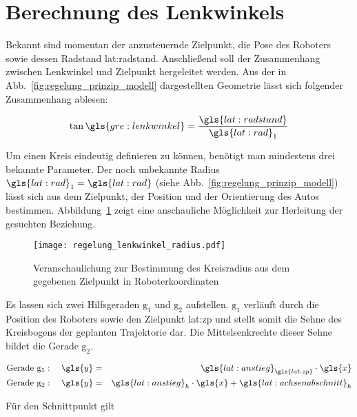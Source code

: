 \section{Berechnung des Lenkwinkels}

Bekannt sind momentan der anzusteuernde Zielpunkt, die Pose des Roboters sowie dessen Radstand \gls{lat:radstand}. Anschließend soll der Zusammenhang zwischen Lenkwinkel und Zielpunkt hergeleitet werden. 
Aus der in Abb.~\ref{fig:regelung_prinzip_modell} dargestellten Geometrie lässt sich folgender Zusammenhang ablesen:

\begin{equation}
\tan \gls{gre:lenkwinkel} = \frac{\gls{lat:radstand}}{{\gls{lat:rad}}_1}
\label{eq:regelung_lenkwinkel_lenkwinkeltan}
\end{equation}

Um einen Kreis eindeutig definieren zu können, benötigt man mindestens drei bekannte Parameter. Der noch unbekannte Radius \({\gls{lat:rad}}_1 = \gls{lat:rad}\) (siehe Abb.~\ref{fig:regelung_prinzip_modell}) lässt sich aus dem Zielpunkt, der Position und der Orientierung des Autos bestimmen. Abbildung~\ref{fig:regelung_lenkwinkel_radius} zeigt eine anschauliche Möglichkeit zur Herleitung der gesuchten Beziehung. 

\begin{figure}[H] %
  \centering
  \texttt{[image: regelung\_lenkwinkel\_radius.pdf]}
  \caption{Veranschaulichung zur Bestimmung des Kreisradius aus dem gegebenen Zielpunkt in Roboterkoordinaten}
  \label{fig:regelung_lenkwinkel_radius}
\end{figure}

Es lassen sich zwei Hilfsgeraden \( \mathrm{g_1} \) und \( \mathrm{g_2} \) aufstellen. \( \mathrm{g_1}\) verläuft durch die Position des Roboters  sowie den Zielpunkt \gls{lat:zp} und stellt somit die Sehne des Kreisbogens der geplanten Trajektorie dar. Die Mittelsenkrechte dieser Sehne bildet die Gerade \( \mathrm{g_2} \).

\begin{eqnarray}
\text{Gerade } \mathrm{g_1}: \quad \gls{y} & = & {\gls{lat:anstieg}}_{\gls{lat:zp}} \cdot \gls{x} 	\\
\text{Gerade } \mathrm{g_2}: \quad \gls{y} & = & {\gls{lat:anstieg}}_h \cdot \gls{x} + {\gls{lat:achsenabschnitt}}_h  \label{eq:regelung_lenkwinkel_geradengleichung2}
\end{eqnarray}

Für den Schnittpunkt  gilt

